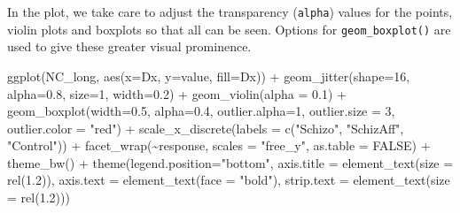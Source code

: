 \documentclass[
  letterpaper,
  10pt,
  krantz2]{krantz}
\makeatletter
\newenvironment{Shaded}{\begin{snugshade}}{\end{snugshade}}
\newcommand{\AttributeTok}[1]{\textcolor[rgb]{0.40,0.45,0.13}{#1}}
\newcommand{\ConstantTok}[1]{\textcolor[rgb]{0.56,0.35,0.01}{#1}}
\newcommand{\DecValTok}[1]{\textcolor[rgb]{0.68,0.00,0.00}{#1}}
\newcommand{\FloatTok}[1]{\textcolor[rgb]{0.68,0.00,0.00}{#1}}
\newcommand{\FunctionTok}[1]{\textcolor[rgb]{0.28,0.35,0.67}{#1}}
\newcommand{\NormalTok}[1]{\textcolor[rgb]{0.00,0.23,0.31}{#1}}
\newcommand{\SpecialCharTok}[1]{\textcolor[rgb]{0.37,0.37,0.37}{#1}}
\newcommand{\StringTok}[1]{\textcolor[rgb]{0.13,0.47,0.30}{#1}}
\newenvironment{kframe}{%
  \medskip{}
  \setlength{\fboxsep}{.8em}
  \def\at@end@of@kframe{}%
  \ifinner\ifhmode%
  \def\at@end@of@kframe{\end{minipage}}%
  \begin{minipage}{\columnwidth}%
  \fi\fi%
  \def\FrameCommand##1{\hskip\@totalleftmargin \hskip-\fboxsep
  \colorbox{shadecolor}{##1}\hskip-\fboxsep
      \hskip-\linewidth \hskip-\@totalleftmargin \hskip\columnwidth}%
  \MakeFramed {\advance\hsize-\width
    \@totalleftmargin\z@ \linewidth\hsize
    \@setminipage}}%
{\par\unskip\endMakeFramed%
  \at@end@of@kframe}
\renewenvironment{Shaded}{\begin{kframe}}{\end{kframe}}
\makeatother
\begin{document}
In the plot, we take care to adjust the transparency (\texttt{alpha})
values for the points, violin plots and boxplots so that all can be
seen. Options for \texttt{geom\_boxplot()} are used to give these
greater visual prominence.

\begin{Shaded}
\begin{Highlighting}[]
\FunctionTok{ggplot}\NormalTok{(NC\_long, }\FunctionTok{aes}\NormalTok{(}\AttributeTok{x=}\NormalTok{Dx, }\AttributeTok{y=}\NormalTok{value, }\AttributeTok{fill=}\NormalTok{Dx)) }\SpecialCharTok{+}
  \FunctionTok{geom\_jitter}\NormalTok{(}\AttributeTok{shape=}\DecValTok{16}\NormalTok{, }\AttributeTok{alpha=}\FloatTok{0.8}\NormalTok{, }\AttributeTok{size=}\DecValTok{1}\NormalTok{, }\AttributeTok{width=}\FloatTok{0.2}\NormalTok{) }\SpecialCharTok{+}
  \FunctionTok{geom\_violin}\NormalTok{(}\AttributeTok{alpha =} \FloatTok{0.1}\NormalTok{) }\SpecialCharTok{+}
  \FunctionTok{geom\_boxplot}\NormalTok{(}\AttributeTok{width=}\FloatTok{0.5}\NormalTok{, }\AttributeTok{alpha=}\FloatTok{0.4}\NormalTok{, }
               \AttributeTok{outlier.alpha=}\DecValTok{1}\NormalTok{, }\AttributeTok{outlier.size =} \DecValTok{3}\NormalTok{, }\AttributeTok{outlier.color =} \StringTok{"red"}\NormalTok{) }\SpecialCharTok{+}
  \FunctionTok{scale\_x\_discrete}\NormalTok{(}\AttributeTok{labels =} \FunctionTok{c}\NormalTok{(}\StringTok{"Schizo"}\NormalTok{, }\StringTok{"SchizAff"}\NormalTok{, }\StringTok{"Control"}\NormalTok{)) }\SpecialCharTok{+}
  \FunctionTok{facet\_wrap}\NormalTok{(}\SpecialCharTok{\textasciitilde{}}\NormalTok{response, }\AttributeTok{scales =} \StringTok{"free\_y"}\NormalTok{, }\AttributeTok{as.table =} \ConstantTok{FALSE}\NormalTok{) }\SpecialCharTok{+}
  \FunctionTok{theme\_bw}\NormalTok{() }\SpecialCharTok{+}
  \FunctionTok{theme}\NormalTok{(}\AttributeTok{legend.position=}\StringTok{"bottom"}\NormalTok{,}
        \AttributeTok{axis.title =} \FunctionTok{element\_text}\NormalTok{(}\AttributeTok{size =} \FunctionTok{rel}\NormalTok{(}\FloatTok{1.2}\NormalTok{)),}
        \AttributeTok{axis.text  =} \FunctionTok{element\_text}\NormalTok{(}\AttributeTok{face =} \StringTok{"bold"}\NormalTok{),}
        \AttributeTok{strip.text =} \FunctionTok{element\_text}\NormalTok{(}\AttributeTok{size =} \FunctionTok{rel}\NormalTok{(}\FloatTok{1.2}\NormalTok{)))}
\end{Highlighting}
\end{Shaded}
\end{document}
